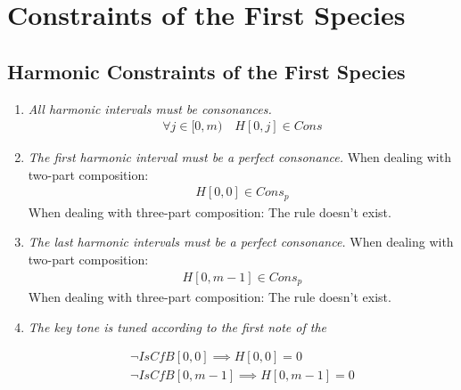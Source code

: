 \section*{Constraints of the First Species}
\subsection*{Harmonic Constraints of the First Species}
\begin{enumerate}[wide, label=\bfseries 1.H\arabic*]
  \item\label{rule:allcons-appendix}{\textit{All harmonic intervals must be consonances.}} 
\begin{equation}
    \begin{gathered}
        \forall j \in [0, m)\quad 
        H[0, j] \in Cons
    \end{gathered}
\end{equation}

\item\label{rule:firstpcons}{\textit{The first harmonic interval must be a perfect consonance.}}
When dealing with two-part composition:
\begin{equation}
    \begin{gathered}
        H[0, 0] \in Cons_{p}
    \end{gathered}
\end{equation}
When dealing with three-part composition:
The rule doesn't exist.

\item\label{rule:lastpcons}{\textit{The last harmonic intervals must be a perfect consonance.}}
When dealing with two-part composition:
\begin{equation}
  \begin{gathered}
      H[0, m-1] \in Cons_{p}
  \end{gathered}
\end{equation}
When dealing with three-part composition:
The rule doesn't exist.

\item\label{rule:keytone}{\textit{The key tone is tuned according to the first note of the \cfdot}}

\begin{equation}
    \begin{gathered}
        \lnot \mathit{IsCfB}[0, 0] \implies H[0, 0] = 0\\
        \lnot \mathit{IsCfB}[0, m-1] \implies H[0, m-1] = 0
    \end{gathered}
\end{equation}


\end{enumerate}

